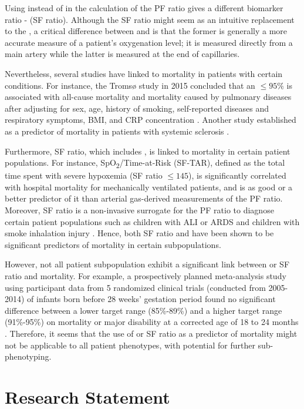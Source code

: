 Using \Sp instead of \Pa in the calculation of the PF ratio gives a different biomarker ratio - \SF (SF ratio). Although the SF ratio might seem as an intuitive replacement to the \PF, a critical difference between \Pa and \Sp is that the former is generally a more accurate measure of a patient's oxygenation level; it is measured directly from a main artery while the latter is measured at the end of capillaries. 

Nevertheless, several studies have linked \Sp to mortality in patients with certain conditions. For instance, the Tromsø study in 2015 concluded that an \Sp $\leq95\%$ is associated with all-cause mortality and mortality caused by pulmonary diseases after adjusting for sex, age, history of smoking, self-reported diseases and respiratory symptoms, BMI, and CRP concentration \citep{vold2015low}. Another study established \Sp as a predictor of mortality in patients with systemic sclerosis  \citep{swigris2009exercise}. 

Furthermore, SF ratio, which includes \Sp, is linked to mortality in certain patient populations. For instance, SpO\textsubscript{2}/\Fi Time-at-Risk (SF-TAR), defined as the total time spent with severe hypoxemia (SF ratio $\leq 145$), is  significantly correlated with hospital mortality for mechanically ventilated patients, and is as good or a better predictor of it than arterial gas-derived measurements of the PF ratio. Moreover, SF ratio is a non-invasive surrogate for the PF ratio to diagnose certain patient populations such as children with ALI or ARDS \citep{rice2007comparison} and children with smoke inhalation injury \citep{cambiaso2017correlation}. Hence, both SF ratio and \Sp have been shown to be significant predictors of mortality in certain subpopulations. 

However, not all patient subpopulation exhibit a significant link between \Sp or SF ratio and mortality. For example, a prospectively planned meta-analysis study using participant data from 5 randomized clinical trials (conducted from 2005-2014) of infants born before 28 weeks' gestation period found no significant difference between a lower \Sp target range (85\%-89\%) and a higher \Sp target range (91\%-95\%) on mortality or major disability at a corrected age of 18 to 24 months \citep{askie2018association}. Therefore, it seems that the use of \Sp or SF ratio as a predictor of mortality might not be applicable to all patient phenotypes, with potential for further sub-phenotyping. 


\section{Research Statement} 


